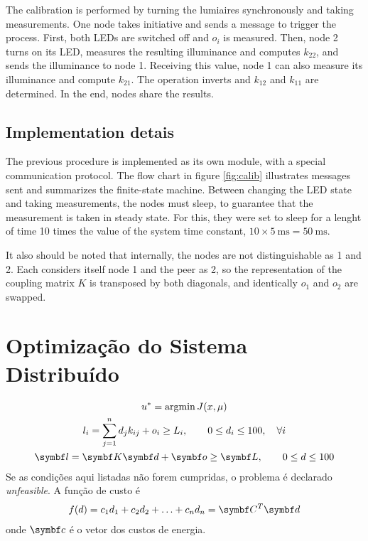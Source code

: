 \documentclass[english,fira]{ist-report}
\begin{document}
The calibration is performed by turning the lumiaires synchronously and taking measurements. One node takes initiative and sends a message to trigger the process. First, both LEDs are switched off and $o_i$ is measured.
Then, node 2 turns on its LED, measures the resulting illuminance and computes $k_{22}$, and sends the illuminance to node 1. Receiving this value, node 1 can also measure its illuminance and compute $k_{21}$. The operation inverts and $k_{12}$ and $k_{11}$ are determined. In the end, nodes share the results.

\subsection{Implementation detais}

The previous procedure is implemented as its own module, with a special communication protocol. The flow chart in figure \ref{fig:calib} illustrates messages sent and summarizes the finite-state machine.
Between changing the LED state and taking measurements, the nodes must sleep, to guarantee that the measurement is taken in steady state. For this, they were set to sleep for a lenght of time 10 times the value of the system time constant, $10 \times \SI{5}{\milli \second} = \SI{50}{\milli \second}$. 

It also should be noted that internally, the nodes are not distinguishable as 1 and 2. Each considers itself node 1 and the peer as 2, so the representation of the coupling matrix $K$ is transposed by both diagonals, and identically $o_1$ and $o_2$ are swapped.

\section{Optimização do Sistema Distribuído}

\begin{gather*}
	u^* = \text{argmin}\,J(x, \mu) \\
	l_i = \sum^n_{j=1} d_j k_{ij} + o_i \geq L_i, \qquad 0 \leq d_i \leq 100, \quad \forall i \\
	\matr{l} = \matr{K}\matr{d} + \matr{o} \geq \matr{L}, \qquad 0 \leq d \leq 100
\end{gather*}
Se as condições aqui listadas não forem cumpridas, o problema é declarado \textit{unfeasible}. A função de custo é
\begin{gather*}
	f(d) = c_1d_1 + c_2d_2 + \ldots + c_nd_n = \matr{C}^T\matr{d}
\end{gather*}
onde $\matr{c}$ é o vetor dos custos de energia.
\end{document}

